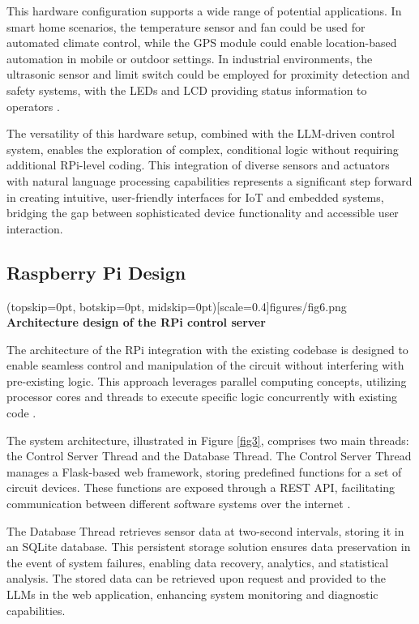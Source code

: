 \documentclass{ieeeaccess}
\begin{document}
This hardware configuration supports a wide range of potential applications. In smart home scenarios, the temperature sensor and fan could be used for automated climate control, while the GPS module could enable location-based automation in mobile or outdoor settings. In industrial environments, the ultrasonic sensor and limit switch could be employed for proximity detection and safety systems, with the LEDs and LCD providing status information to operators \cite{mcmanus2021}.

The versatility of this hardware setup, combined with the LLM-driven control system, enables the exploration of complex, conditional logic without requiring additional RPi-level coding. This integration of diverse sensors and actuators with natural language processing capabilities represents a significant step forward in creating intuitive, user-friendly interfaces for IoT and embedded systems, bridging the gap between sophisticated device functionality and accessible user interaction.

\subsection{Raspberry Pi Design}

\Figure[t!](topskip=0pt, botskip=0pt,
midskip=0pt)[scale=0.4]{{figures/fig6.png}}
{ \textbf{Architecture design of the RPi control server}\label{fig3}}

The architecture of the RPi integration with the existing codebase is designed to enable seamless control and manipulation of the circuit without interfering with pre-existing logic. This approach leverages parallel computing concepts, utilizing processor cores and threads to execute specific logic concurrently with existing code \cite{wilkinson2005parallel}.

The system architecture, illustrated in Figure  \ref{fig3}, comprises two main threads: the Control Server Thread and the Database Thread. The Control Server Thread manages a Flask-based web framework, storing predefined functions for a set of circuit devices. These functions are exposed through a REST API, facilitating communication between different software systems over the internet \cite{Surwase2016RESTAM}.

The Database Thread retrieves sensor data at two-second intervals, storing it in an SQLite database. This persistent storage solution ensures data preservation in the event of system failures, enabling data recovery, analytics, and statistical analysis. The stored data can be retrieved upon request and provided to the LLMs in the web application, enhancing system monitoring and diagnostic capabilities.
\end{document}
